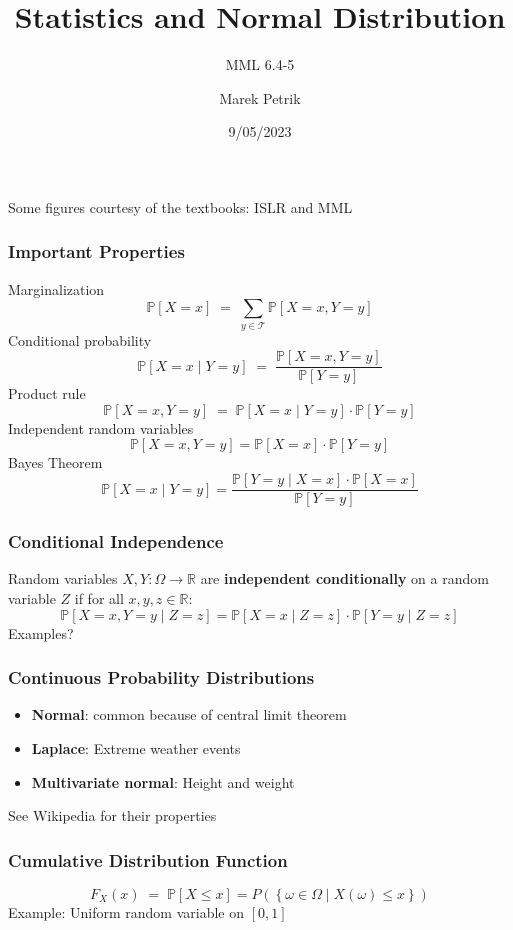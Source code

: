 \documentclass{beamer}
\title{Statistics and Normal Distribution}
\subtitle{MML 6.4-5}
\author{Marek Petrik}
\date{9/05/2023}
\newcommand{\Real}{\mathbb{R}}
\renewcommand{\P}[1]{\mathbb{P}\left[#1\right]}
\begin{document}
\begin{frame}
\maketitle
{\tiny Some figures courtesy of the textbooks: ISLR and MML}
\end{frame}


\begin{frame} \frametitle{Important Properties}
  Marginalization
  \[
   \P{X = x}\;=\; \sum_{y\in \mathcal{T}} \P{X = x, Y = y} 
 \]
 Conditional probability
  \[
    \P{ X = x \mid Y = y } \; =\;  \frac{\P{ X = x, Y = y }}{\P{ Y = y }}
  \] 
  Product rule
  \[
     \P{ X = x, Y = y } \; =\;  \P{ X = x \mid Y = y } \cdot \P{ Y = y }
  \] 
  Independent random variables
  \[
    \P{ X = x,Y = y } = \P{ X = x } \cdot  \P{ Y = y }
  \]
  Bayes Theorem
  \[
   \P{ X = x \mid Y = y } =
    \frac{\P{ Y = y \mid X = x } \cdot \P{ X = x }}{\P{ Y = y }}
  \]
\end{frame}

\begin{frame} \frametitle{Conditional Independence}
Random variables $X,Y \colon \Omega \to \Real$ are \textbf{independent conditionally} on a random variable $Z$ if for all $x,y,z \in \Real$:
\[\P{ X = x,Y = y \mid Z = z} = \P{ X = x \mid Z = z} \cdot  \P{ Y = y \mid Z = z} \]
Examples?\\
\vspace{4cm}
\end{frame}

\begin{frame}\frametitle{Continuous Probability Distributions} 
    \begin{itemize}
    \item \textbf{Normal}: common because of central limit theorem
    \item \textbf{Laplace}: Extreme weather events
    \item \textbf{Multivariate normal}: Height and weight
    \end{itemize}
  {\small See Wikipedia for their properties}
\end{frame}

\begin{frame} \frametitle{Cumulative Distribution Function}
  \[
    F_X(x) \; =\;  \P{X \le x} = 
    P \left( \left\{ \omega \in  \Omega \mid X(\omega) \le x \right\} \right)
  \]
  Example: Uniform random variable on $[0,1]$
  \vspace{5cm}
\end{frame}
\end{document}
